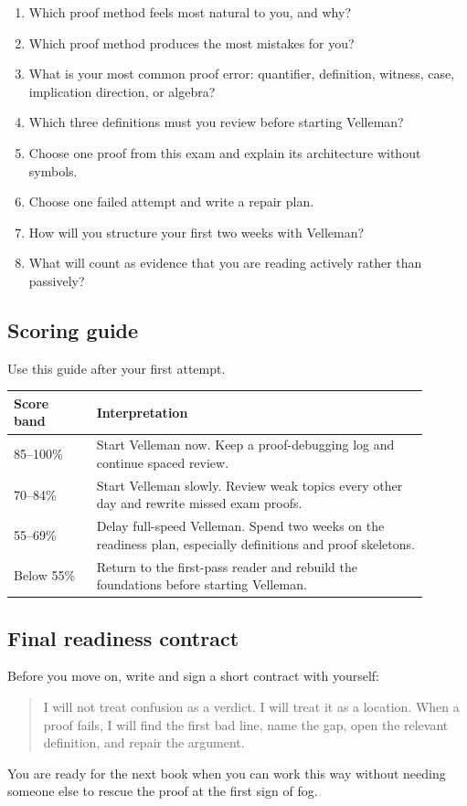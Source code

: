 \begin{enumerate}
\item Which proof method feels most natural to you, and why?
\item Which proof method produces the most mistakes for you?
\item What is your most common proof error: quantifier, definition, witness, case, implication direction, or algebra?
\item Which three definitions must you review before starting Velleman?
\item Choose one proof from this exam and explain its architecture without symbols.
\item Choose one failed attempt and write a repair plan.
\item How will you structure your first two weeks with Velleman?
\item What will count as evidence that you are reading actively rather than passively?
\end{enumerate}

\subsection{Scoring guide}

Use this guide after your first attempt.

\begin{longtable}{p{0.18\linewidth}p{0.72\linewidth}}
\toprule
Score band & Interpretation \\
\midrule
85--100\% & Start Velleman now. Keep a proof-debugging log and continue spaced review. \\
70--84\% & Start Velleman slowly. Review weak topics every other day and rewrite missed exam proofs. \\
55--69\% & Delay full-speed Velleman. Spend two weeks on the readiness plan, especially definitions and proof skeletons. \\
Below 55\% & Return to the first-pass reader and rebuild the foundations before starting Velleman. \\
\bottomrule
\end{longtable}

\subsection{Final readiness contract}

Before you move on, write and sign a short contract with yourself:

\begin{quote}
I will not treat confusion as a verdict. I will treat it as a location. When a proof fails, I will find the first bad line, name the gap, open the relevant definition, and repair the argument.
\end{quote}

\begin{focusbox}
You are ready for the next book when you can work this way without needing someone else to rescue the proof at the first sign of fog.
\end{focusbox}
